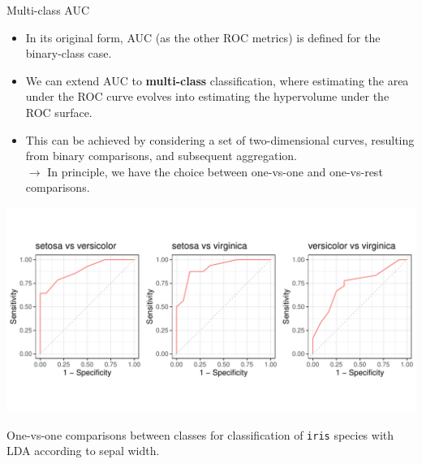 


\begin{vbframe}{Multi-class AUC}


\begin{itemize}
  \small
  \item In its original form, AUC (as the other ROC metrics) is defined for the 
  binary-class case.
  \item We can extend AUC to \textbf{multi-class} classification, where 
  estimating the area under the ROC curve evolves into estimating the 
  hypervolume under the ROC surface.
  \item This can be achieved by considering a set of two-dimensional curves, 
  resulting from binary comparisons, and subsequent aggregation. \\
  $\rightarrow$ In principle, we have the choice between one-vs-one and 
  one-vs-rest comparisons.
\end{itemize}  

\vfill
 
\begin{minipage}[c]{0.75\textwidth}
  \centering
  \includegraphics[trim = 0 40 -20 40, clip, width=\textwidth]
  {figure/eval_auc_extensions}
\end{minipage}%
\begin{minipage}[c]{0.25\textwidth}
  \scriptsize
  \raggedright
  One-vs-one comparisons between classes for classification of \texttt{iris} 
  species with LDA according to sepal width.
\end{minipage}
 
 

\end{vbframe}
